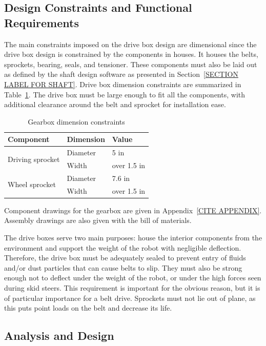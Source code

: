 \subsection{Design Constraints and Functional Requirements}

The main constraints imposed on the drive box design are dimensional since the drive box design is constrained by the components in houses. It houses the belts, sprockets, bearing, seals, and tensioner. These components must also be laid out as defined by the shaft design software as presented in Section~\ref{SECTION LABEL FOR SHAFT}. %
Drive box dimension constraints are summarized in Table~\ref{tab:box_dim}. The drive box must be large enough to fit all the components, with additional clearance around the belt and sprocket for installation ease.

\begin{table}[htbp]
\centering
\caption{Gearbox dimension constraints}
\begin{tabular}{| lll |}\hline
Component & Dimension & Value \\ \hline
\multirow{2}{*}{Driving sprocket} & Diameter & 5  in \\
& Width & over 1.5 in \\
\multirow{2}{*}{Wheel sprocket} & Diameter & 7.6  in \\
& Width & over 1.5 in \\ \hline
\end{tabular}
\label{tab:box_dim}
\end{table}

Component drawings for the gearbox are given in Appendix~\ref{CITE APPENDIX}. Assembly drawings are also given with the bill of materials.

The drive boxes serve two main purposes: house the interior components from the environment and support the weight of the robot with negligible deflection. Therefore, the drive box must be adequately sealed to prevent entry of fluids and/or dust particles that can cause belts to slip. They must also be strong enough not to deflect under the weight of the robot, or under the high forces seen during skid steers. This requirement is important for the obvious reason, but it is of particular importance for a belt drive. Sprockets must not lie out of plane, as this puts point loads on the belt and decrease its life.

\subsection{Analysis and Design}

